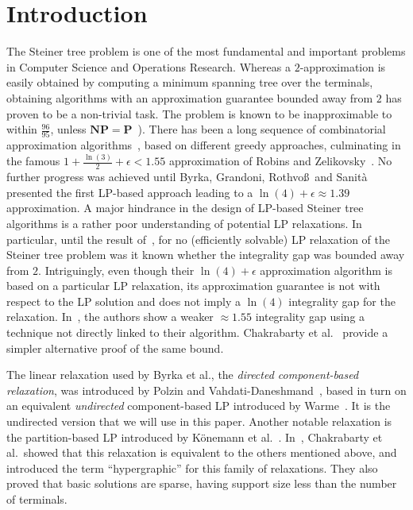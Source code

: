 \documentclass[11pt, letterpaper]{article}
\theoremstyle{definition}
\begin{document}
\newpage

\section{Introduction}

The Steiner tree problem is one of the most fundamental and
important problems in Computer Science and Operations Research.
Whereas a $2$-approximation is easily obtained by computing a
minimum spanning tree over the terminals, obtaining algorithms
with an approximation guarantee bounded away from $2$ has proven
to be a non-trivial task.
The problem is known to be inapproximable to within $\frac{96}{95}$,
unless $\mathbf{NP} = \mathbf{P}$~\cite{BP89,CC08}).
There has been a long sequence of
combinatorial approximation algorithms~\cite{GP68,zelikovsky_1993_11_over_6_apx,KZ97,PS00,RZ05},
based on different greedy approaches, culminating in the famous
$1+\frac{\ln(3)}{2}+\epsilon<1.55$ approximation of
Robins and Zelikovsky~\cite{RZ05}.
No further progress was achieved until 
Byrka, Grandoni, Rothvo\ss\ and Sanit\`a~\cite{byrka_2011_steiner} presented 
the first LP-based approach leading to a
$\ln(4)+\epsilon\approx 1.39$ approximation.
A major hindrance in the design of LP-based Steiner
tree algorithms is a rather poor understanding of
potential LP relaxations. In particular, until
the result of~\cite{byrka_2011_steiner}, for no (efficiently
solvable) LP relaxation of the Steiner tree problem was
it known whether the integrality gap was bounded away from $2$.
Intriguingly, even though their $\ln(4)+\epsilon$ approximation
algorithm is based on a particular LP relaxation, its approximation guarantee is
not with respect to the LP solution and does not imply a
$\ln(4)$ integrality gap for the relaxation.
In~\cite{byrka_2011_steiner}, the authors show 
a weaker $\approx 1.55$ integrality gap
using a technique not directly linked to their algorithm.
Chakrabarty et al.~\cite{chakrabarty_2010_integralitygap} provide a simpler alternative proof of the same bound.

The linear relaxation used by Byrka et al., the \emph{directed component-based relaxation}, was introduced 
by Polzin and Vahdati-Daneshmand~\cite{PV03}, based in turn on an equivalent \emph{undirected} component-based
LP introduced by Warme~\cite{warme_1998_hyperspanningtrees}.
It is the undirected version that we will use in this paper.
Another notable relaxation is the partition-based LP introduced by K\"onemann et al.~\cite{koenemann_2011_partition_based_LP}.
In~\cite{chakrabarty_2010_hypergraphic}, Chakrabarty et al.~showed that this relaxation is equivalent to the others mentioned above, and introduced the term ``hypergraphic'' for this family of relaxations.
They also proved that basic solutions are sparse, having support size less than the number of terminals.
\end{document}
